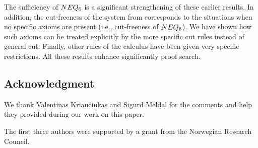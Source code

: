 \documentclass[10pt]{article}
\begin{document}
The sufficiency of $NEQ_6$ is a significant strengthening of these earlier results.
In addition, the cut-freeness of the system from \cite{BK95} corresponds to the 
situations when
no specific axioms are present (i.e., cut-freeness of $NEQ_6$). 
We have shown how such axioms can be treated explicitly by
the more specific cut rules instead of general cut. Finally, other rules of the 
calculus have
been given very specific restrictions. All these results enhance significantly 
proof search.

\subsection*{Acknowledgment}
We thank Valentinas Kriau\v ciukas and Sigurd
Meldal for the comments and help they provided during our work on this paper.

The first three authors were supported by a grant from the Norwegian Research Council.
\end{document}
